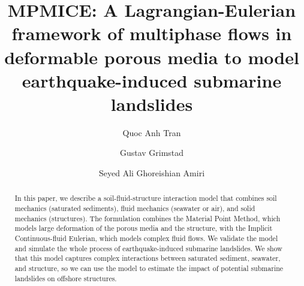 \documentclass[preprint,12pt]{elsarticle}
\begin{document}

%
\setcounter{equation}{0}
\setcounter{figure}{0}
\setcounter{section}{0}
%
 

\begin{frontmatter}



\title{MPMICE: A Lagrangian-Eulerian framework of multiphase flows in deformable porous media to model earthquake-induced submarine landslides }


\author[label1]{Quoc Anh Tran}
\author[label1]{Gustav Grimstad}
\author[label1]{Seyed Ali Ghoreishian Amiri}


\begin{abstract}
In this paper, we describe a soil-fluid-structure interaction model that combines soil mechanics (saturated sediments), fluid mechanics (seawater or air), and solid mechanics (structures). The formulation combines the Material Point Method, which models large deformation of the porous media and the structure, with the Implicit Continuous-fluid Eulerian, which models complex fluid flows. We validate the model and simulate the whole process of earthquake-induced submarine landslides. We show that this model captures complex interactions between saturated sediment, seawater, and structure, so we can use the model to estimate the impact of potential submarine landslides on offshore structures.




\end{abstract}
\end{frontmatter}
\end{document}
